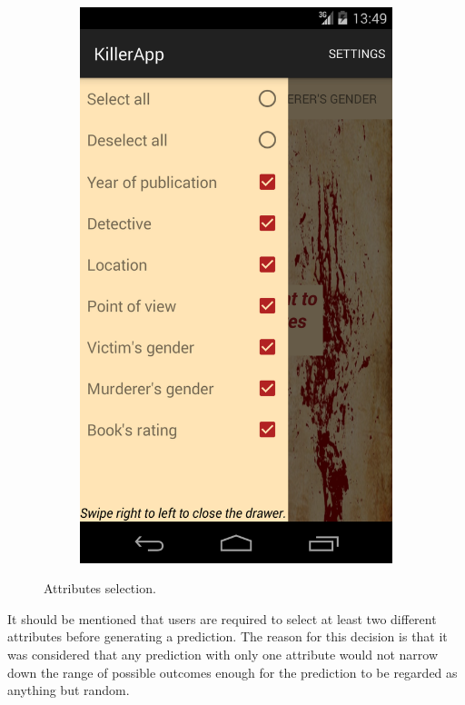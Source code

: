 \documentclass{mproj}
\begin{document}
\begin{figure}[h]
\begin{subfigure}{0.3\textwidth}
	\end{subfigure}		
	\quad
	\begin{subfigure}{0.3\textwidth}
		\includegraphics[width=\textwidth]{images/attributes_drawer}
	\end{subfigure}			
	\caption{Attributes selection.}
	\label{fig:attributes_selection}
\end{figure}

It should be mentioned that users are required to select at least two different attributes before generating a prediction. The reason for this decision is that it was considered that any prediction with only one attribute would not narrow down the range of possible outcomes enough for the prediction to be regarded as anything but random. \par
\end{document}
